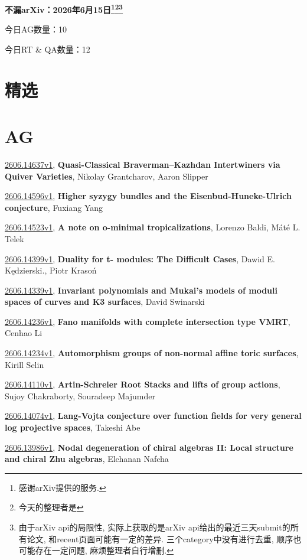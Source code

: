 \documentclass[9pt, a4paper]{article}
\theoremstyle{plain}
\theoremstyle{definition}
\theoremstyle{remark}
\newcommand{\arxiv}[3]{\href{https://arxiv.org/abs/#1}{#1}, \textbf{\textcolor{arxivblue}{#2}}, #3}
\newcommand{\AGnumber}{10}
\newcommand{\RTQAnumber}{12}
\newcommand{\NewestDate}{2026年6月15日}
\newcommand{\todayarXiver}{} %
\begin{document}
\begin{center}
    \Huge\textbf{不漏arXiv：\NewestDate\footnote{感谢arXiv提供的服务.}\footnote{今天的整理者是\todayarXiver}\footnote{由于arXiv api的局限性, 实际上获取的是arXiv api给出的最近三天submit的所有论文, 和recent页面可能有一定的差异. 三个category中没有进行去重, 顺序也可能存在一定问题, 麻烦整理者自行增删.}} \\
\end{center}

\setcounter{section}{-1}

\begin{center}
    今日AG数量：\AGnumber
    
    今日RT \& QA数量：\RTQAnumber
    
\end{center}


\section{精选}


\section{AG}
\arxiv{2606.14637v1}{Quasi-Classical Braverman--Kazhdan Intertwiners via Quiver Varieties}{Nikolay Grantcharov, Aaron Slipper}

\arxiv{2606.14596v1}{Higher syzygy bundles and the Eisenbud-Huneke-Ulrich conjecture}{Fuxiang Yang}

\arxiv{2606.14523v1}{A note on o-minimal tropicalizations}{Lorenzo Baldi, Máté L. Telek}

\arxiv{2606.14399v1}{Duality for t- modules: The Difficult Cases}{Dawid E. Kędzierski., Piotr Krasoń}

\arxiv{2606.14339v1}{Invariant polynomials and Mukai's models of moduli spaces of curves and K3 surfaces}{David Swinarski}

\arxiv{2606.14236v1}{Fano manifolds with complete intersection type VMRT}{Cenhao Li}

\arxiv{2606.14234v1}{Automorphism groups of non-normal affine toric surfaces}{Kirill Selin}

\arxiv{2606.14110v1}{Artin-Schreier Root Stacks and lifts of group actions}{Sujoy Chakraborty, Souradeep Majumder}

\arxiv{2606.14074v1}{Lang-Vojta conjecture over function fields for very general log projective spaces}{Takeshi Abe}

\arxiv{2606.13986v1}{Nodal degeneration of chiral algebras II: Local structure and chiral Zhu algebras}{Elchanan Nafcha}
\end{document}
